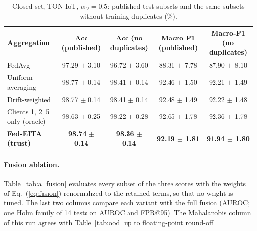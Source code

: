 \documentclass[pdflatex,sn-mathphys-num]{sn-jnl}
\begin{document}
{{{{{{\begin{table}[!htbp]\centering
\caption{Closed set, TON-IoT, $\alpha_D=0.5$: published test subsets and the same subsets without training duplicates (\%).}\label{tab:a_dedup_closed}
\scriptsize
\setlength{\tabcolsep}{4pt}
\begin{tabular}{lcccc}\toprule
Aggregation & Acc (published) & Acc (no duplicates) & Macro-F1 (published) & Macro-F1 (no duplicates) \\ \midrule
FedAvg & 97.29 $\pm$ 3.10 & 96.72 $\pm$ 3.60 & 88.31 $\pm$ 7.78 & 87.90 $\pm$ 8.10 \\
Uniform averaging & 98.77 $\pm$ 0.14 & 98.41 $\pm$ 0.14 & 92.46 $\pm$ 1.50 & 92.21 $\pm$ 1.49 \\
Drift-weighted & 98.77 $\pm$ 0.14 & 98.41 $\pm$ 0.14 & 92.48 $\pm$ 1.49 & 92.22 $\pm$ 1.48 \\
Clients 1, 2, 5 only (oracle) & 98.63 $\pm$ 0.25 & 98.22 $\pm$ 0.28 & 92.65 $\pm$ 1.78 & 92.36 $\pm$ 1.78 \\
\textbf{Fed-EITA (trust)} & \textbf{98.74 $\pm$ 0.14} & \textbf{98.36 $\pm$ 0.14} & \textbf{92.19 $\pm$ 1.81} & \textbf{91.94 $\pm$ 1.80} \\
\bottomrule\end{tabular}
\end{table}

\begin{table}[!htbp]\centering
\caption{Zero-day setting, fused score with trust-weighted aggregation, with and without training duplicates (\%).}\label{tab:a_dedup_zd}
\scriptsize
\setlength{\tabcolsep}{3pt}
\end{table}

\paragraph{Fusion ablation.} Table~\ref{tab:a_fusion} evaluates every subset of the three scores with the weights of Eq.~(\ref{eq:fusion}) renormalized to the retained terms, so that no weight is tuned. The last two columns compare each variant with the full fusion (AUROC; one Holm family of 14 tests on AUROC and FPR@95). The Mahalanobis column of this run agrees with Table~\ref{tab:ood} up to floating-point round-off.

}}}}}}
\end{document}

